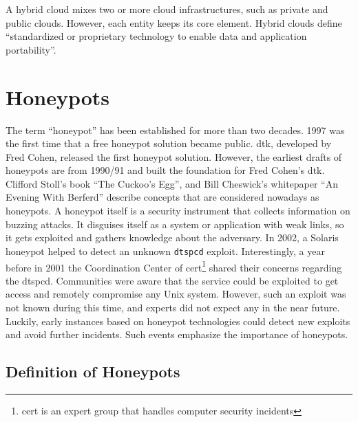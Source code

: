 A hybrid cloud mixes two or more cloud infrastructures, such as private and public clouds.
However, each entity keeps its core element.
Hybrid clouds define \enquote{standardized or proprietary technology to enable data and application portability}\cite{Mell2011}.

\section{Honeypots}

The term \enquote{honeypot} has been established for more than two decades.
1997 was the first time that a free honeypot solution became public.
\ac{dtk}, developed by Fred Cohen, released the first honeypot solution.
However, the earliest drafts of honeypots are from 1990/91 and built the foundation for Fred Cohen's \ac*{dtk}.
Clifford Stoll's book \enquote{The Cuckoo's Egg}\cite{stroll2000}, and Bill Cheswick's whitepaper \enquote{An Evening With Berferd}\cite{Cheswick92} describe concepts that are considered nowadays as honeypots.\cite{Spitzner2003}
A honeypot itself is a security instrument that collects information on buzzing attacks.
It disguises itself as a system or application with weak links, so it gets exploited and gathers knowledge about the adversary.
In 2002, a Solaris honeypot helped to detect an unknown \verb|dtspcd| exploit.
Interestingly, a year before in 2001 the Coordination Center of \acs{cert}\footnote{\acl{cert} is an expert group that handles computer security incidents\cite{cert2021}} shared their concerns regarding the dtspcd.
Communities were aware that the service could be exploited to get access and remotely compromise any Unix system.
However, such an exploit was not known during this time, and experts did not expect any in the near future.
Luckily, early instances based on honeypot technologies could detect new exploits and avoid further incidents.
Such events emphasize the importance of honeypots.

\subsection{Definition of Honeypots}

